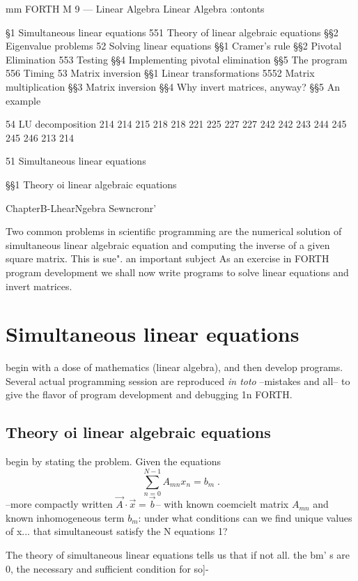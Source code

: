 mm FORTH M 9 — Linear Algebra
Linear Algebra
:ontonts

\S1 Simultaneous linear equations
551 Theory of linear algebraic equations
\S\S2 Eigenvalue problems
52 Solving linear equations
\S\S1 Cramer's rule
\S\S2 Pivotal Elimination
553 Testing
\S\S4 Implementing pivotal elimination
\S\S5 The program
556 Timing
53 Matrix inversion
\S\S1 Linear transformations
5552 Matrix multiplication
\S\S3 Matrix inversion
\S\S4 Why invert matrices, anyway?
\S\S5 An example

54 LU decomposition 214 214 215 218 218 221 225 227 227 242 242 243 244 245 245 246 213 214

51 Simultaneous linear equations

\S\S1 Theory oi linear algebraic equations

ChapterB-LhearNgebra Sewncronr'

      
 
   
 

Two common problems in scientific programming are the
numerical solution of simultaneous linear algebraic equation
and computing the inverse of a given square matrix. This is sue".
an important subject As an exercise in FORTH program
development we shall now write programs to solve linear equations and invert matrices.

\section{Simultaneous linear equations}
 begin with a dose of mathematics (linear algebra), and 
then develop programs. Several actual programming session
are reproduced \textit{in toto} --mistakes and all-- to give the flavor of
program development and debugging 1n FORTH.
\subsection{Theory oi linear algebraic equations}
 begin by stating the problem. Given the equations
\begin{equation}
\sum_{n=0}^{N-1}A_{mn}x_n=b_m \;.
\end{equation}
--more compactly written $\vec{A} \cdot \vec{x} = \vec{b}$-- with known coemcielt
matrix $A_{mn}$ and known inhomogeneous term $b_m$: under what
conditions can we find unique values of x... that simultaneoust
satisfy the N equations 1?

The theory of simultaneous linear equations tells us that if not all.
the bm' s are 0, the necessary and sufficient condition for so]-


